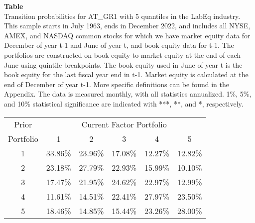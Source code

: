 \begin{table*}[ht!]
\raggedright
{}
\label{tab: transition_probs_AT_GR1_LabEq_with_5_quantiles}
\textbf{Table \thetable} \\
Transition probabilities for AT_GR1 with 5 quantiles in the LabEq industry. \\
\hspace*{1em}This sample starts in July 1963, ends in December 2022, and includes all NYSE, AMEX, and NASDAQ common stocks for which we have market equity data for December of year t-1 and June of year t, and book equity data for t-1. The portfolios are constructed on book equity to market equity at the end of each June using quintile breakpoints.  The book equity used in June of year t is the book equity for the last fiscal year end in t-1.  Market equity is calculated at the end of December of year t-1.  More specific definitions can be found in the Appendix.  The data is measured monthly, with all statistics annualized.  1\%, 5\%, and 10\% statistical significance are indicated with ***, **, and *, respectively. \\
\vspace{0.5em}
\centering
\begin{adjustbox}{max width=\textwidth}
\begin{tabular}{@{}cccccc@{}}
\toprule
Prior & \multicolumn{5}{c}{Current Factor Portfolio} \\
Portfolio & 1 & 2 & 3 & 4 & 5 \\
\midrule
1 & 33.86\% & 23.96\% & 17.08\% & 12.27\% & 12.82\% \\
2 & 23.18\% & 27.79\% & 22.93\% & 15.99\% & 10.10\% \\
3 & 17.47\% & 21.95\% & 24.62\% & 22.97\% & 12.99\% \\
4 & 11.61\% & 14.51\% & 22.41\% & 27.97\% & 23.50\% \\
5 & 18.46\% & 14.85\% & 15.44\% & 23.26\% & 28.00\% \\
\bottomrule
\end{tabular}
\end{adjustbox}
\end{table*}